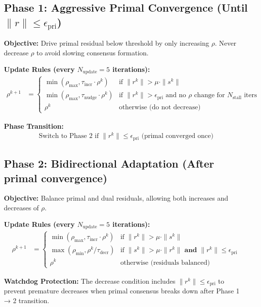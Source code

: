 \documentclass[11pt]{article}
\begin{document}
\subsection{Phase 1: Aggressive Primal Convergence (Until $\|r\| \leq \epsilon_{\text{pri}}$)}

\textbf{Objective:} Drive primal residual below threshold by only increasing $\rho$. Never decrease $\rho$ to avoid slowing consensus formation.

\textbf{Update Rules (every $N_{\text{update}} = 5$ iterations):}
\begin{align}
\rho^{k+1} &= \begin{cases}
\min(\rho_{\max}, \tau_{\text{incr}} \cdot \rho^k) & \text{if } \|r^k\| > \mu \cdot \|s^k\| \\
\min(\rho_{\max}, \tau_{\text{nudge}} \cdot \rho^k) & \text{if } \|r^k\| > \epsilon_{\text{pri}} \text{ and no $\rho$ change for } N_{\text{stall}} \text{ iters} \\
\rho^k & \text{otherwise (do not decrease)}
\end{cases}
\end{align}

\textbf{Phase Transition:}
\begin{align}
\text{Switch to Phase 2 if } \|r^k\| \leq \epsilon_{\text{pri}} \text{ (primal converged once)}
\end{align}

\subsection{Phase 2: Bidirectional Adaptation (After primal convergence)}

\textbf{Objective:} Balance primal and dual residuals, allowing both increases and decreases of $\rho$.

\textbf{Update Rules (every $N_{\text{update}} = 5$ iterations):}
\begin{align}
\rho^{k+1} &= \begin{cases}
\min(\rho_{\max}, \tau_{\text{incr}} \cdot \rho^k) & \text{if } \|r^k\| > \mu \cdot \|s^k\| \\
\max(\rho_{\min}, \rho^k / \tau_{\text{decr}}) & \text{if } \|s^k\| > \mu \cdot \|r^k\| \textbf{ and } \|r^k\| \leq \epsilon_{\text{pri}} \\
\rho^k & \text{otherwise (residuals balanced)}
\end{cases}
\end{align}

\textbf{Watchdog Protection:} The decrease condition includes $\|r^k\| \leq \epsilon_{\text{pri}}$ to prevent premature decreases when primal consensus breaks down after Phase 1 → 2 transition.
\end{document}
